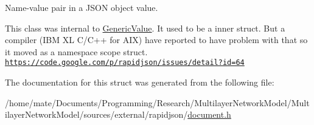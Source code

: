 Name-\/value pair in a J\+S\+ON object value. 

This class was internal to \hyperlink{classGenericValue}{Generic\+Value}. It used to be a inner struct. But a compiler (I\+BM XL C/\+C++ for A\+IX) have reported to have problem with that so it moved as a namespace scope struct. \href{https://code.google.com/p/rapidjson/issues/detail?id=64}{\tt https\+://code.\+google.\+com/p/rapidjson/issues/detail?id=64} 

The documentation for this struct was generated from the following file\+:\begin{DoxyCompactItemize}
\item 
/home/mate/\+Documents/\+Programming/\+Research/\+Multilayer\+Network\+Model/\+Multilayer\+Network\+Model/sources/external/rapidjson/\hyperlink{document_8h}{document.\+h}\end{DoxyCompactItemize}
